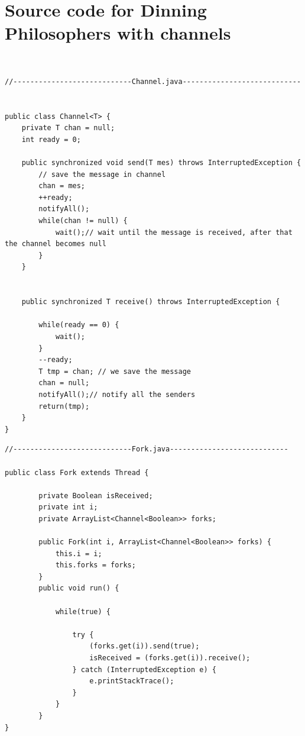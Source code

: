 \documentclass[14pt]{article}
\begin{document}
\newpage
\section*{Source code for Dinning Philosophers with channels}\\
\begin{lstlisting}
//----------------------------Channel.java----------------------------


public class Channel<T> {
	private T chan = null;
	int ready = 0;
	
	public synchronized void send(T mes) throws InterruptedException {
		// save the message in channel
		chan = mes;
		++ready;
		notifyAll();
		while(chan != null) {
			wait();// wait until the message is received, after that the channel becomes null
		}
	}
	
	
	public synchronized T receive() throws InterruptedException {
		
		while(ready == 0) {
			wait();
		}
		--ready;
		T tmp = chan; // we save the message
		chan = null;
		notifyAll();// notify all the senders
		return(tmp);
	}
}	

\end{lstlisting}
\begin{lstlisting}
//----------------------------Fork.java----------------------------

public class Fork extends Thread {

		private Boolean isReceived;
		private int i;
		private ArrayList<Channel<Boolean>> forks;
		
		public Fork(int i, ArrayList<Channel<Boolean>> forks) {
			this.i = i;
			this.forks = forks;
		}
		public void run() {
			
			while(true) {
	
				try {
					(forks.get(i)).send(true);
					isReceived = (forks.get(i)).receive();
				} catch (InterruptedException e) {
					e.printStackTrace();
				}
			}
		}
}

\end{lstlisting}
\end{document}
